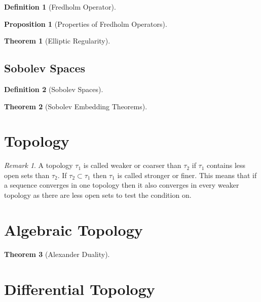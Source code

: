 \documentclass[a4paper]{article}
\theoremstyle{definition}
\newtheorem{thm}{Theorem}
\newtheorem{prop}{Proposition}
\theoremstyle{definition}
\newtheorem{definition}{Definition}
\theoremstyle{remark}
\newtheorem{rmk}{Remark}
\theoremstyle{remark}
\theoremstyle{remark}
\begin{document}
\begin{definition}[Fredholm Operator]
  
\end{definition}

\begin{prop}[Properties of Fredholm Operators]
  
\end{prop}

\begin{thm}[Elliptic Regularity]
  
\end{thm}

\subsection{Sobolev Spaces}

\begin{definition}[Sobolev Spaces]
  
\end{definition}

\begin{thm}[Sobolev Embedding Theorems]
  
\end{thm}

\section{Topology}

\begin{rmk}
  A topology $\tau_1$ is called weaker or coarser than $\tau_2$ if $\tau_1$ contains less open sets than $\tau_2$. If $\tau_2\subset\tau_1$ then $\tau_1$ is called stronger or finer. This means that if a sequence converges in one topology then it also converges in every weaker topology as there are less open sets to test the condition on.
\end{rmk}

\section{Algebraic Topology}

\begin{thm}[Alexander Duality]
  
\end{thm}

\section{Differential Topology}
\end{document}
